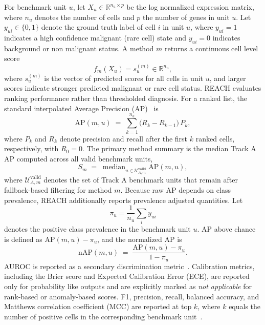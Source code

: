 \documentclass[10pt]{article}
\begin{document}
For benchmark unit $u$, let $X_u\in\mathbb{R}^{n_u\times p}$ be the
log normalized expression matrix, where
$n_u$ denotes the number of cells and $p$ the number of genes in unit $u$.
Let $y_{ui}\in\{0,1\}$ denote the ground truth label of cell $i$ in unit
$u$, where $y_{ui}=1$ indicates a high confidence malignant (rare cell)
state and $y_{ui}=0$ indicates background or non malignant status.
A method $m$ returns a continuous cell level score
\begin{equation}
  f_m(X_u) = s_u^{(m)} \in \mathbb{R}^{n_u},
\end{equation}
where $s_u^{(m)}$ is the vector of predicted scores for all cells in unit
$u$, and larger scores indicate stronger predicted malignant or rare cell
status. REACH evaluates ranking performance rather than thresholded
diagnosis.
For a ranked list, the standard interpolated Average Precision
(AP)~\cite{davis2006relationship,cormack2006statistical} is
\begin{equation}
  \mathrm{AP}(m,u) \;=\; \sum_{k=1}^{n_u}\!\bigl(R_k - R_{k-1}\bigr)\,P_k,
\end{equation}
where $P_k$ and $R_k$ denote precision and recall after the first $k$
ranked cells, respectively, with $R_0 = 0$.
The primary method summary is the median Track A AP
computed across all valid benchmark units,
\begin{equation}
  S_m \;=\;
  \mathop{\mathrm{median}}_{u\in\mathcal{U}_{A,m}^{\mathrm{valid}}}
  \mathrm{AP}(m,u),
\end{equation}
where $\mathcal{U}_{A,m}^{\mathrm{valid}}$ denotes the set of Track A
benchmark units that remain after fallback-based filtering for method $m$.
Because raw AP depends on class prevalence, REACH additionally reports
prevalence adjusted quantities. Let
\begin{equation}
  \pi_u = \frac{1}{n_u}\sum_i y_{ui}
\end{equation}
denotes the positive class prevalence in the benchmark unit $u$. AP above
chance is defined as $\mathrm{AP}(m,u)-\pi_u$, and the normalized AP is
\begin{equation}
  \mathrm{nAP}(m,u)
  \;=\;
  \frac{\mathrm{AP}(m,u)-\pi_u}{1-\pi_u}.
\end{equation}
AUROC is reported as a secondary discrimination
metric~\cite{davis2006relationship,saito2015precision}. Calibration
metrics, including the Brier score and Expected Calibration Error (ECE),
are reported only for probability like outputs and are explicitly marked
as \emph{not applicable} for rank-based or anomaly-based scores. F1,
precision, recall, balanced accuracy, and Matthews correlation coefficient
(MCC) are reported at top $k$, where $k$ equals the number of positive
cells in the corresponding benchmark
unit~\cite{johnson2019survey,altalhan2025imbalanced}.
\end{document}
